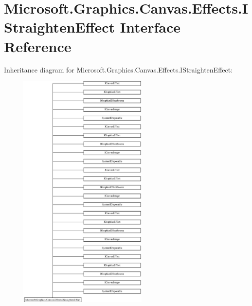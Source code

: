\hypertarget{interface_microsoft_1_1_graphics_1_1_canvas_1_1_effects_1_1_i_straighten_effect}{}\section{Microsoft.\+Graphics.\+Canvas.\+Effects.\+I\+Straighten\+Effect Interface Reference}
\label{interface_microsoft_1_1_graphics_1_1_canvas_1_1_effects_1_1_i_straighten_effect}
Inheritance diagram for Microsoft.\+Graphics.\+Canvas.\+Effects.\+I\+Straighten\+Effect\+:\begin{figure}[H]
\begin{center}
\leavevmode
\includegraphics[height=12.000000cm]{interface_microsoft_1_1_graphics_1_1_canvas_1_1_effects_1_1_i_straighten_effect}
\end{center}
\end{figure}
